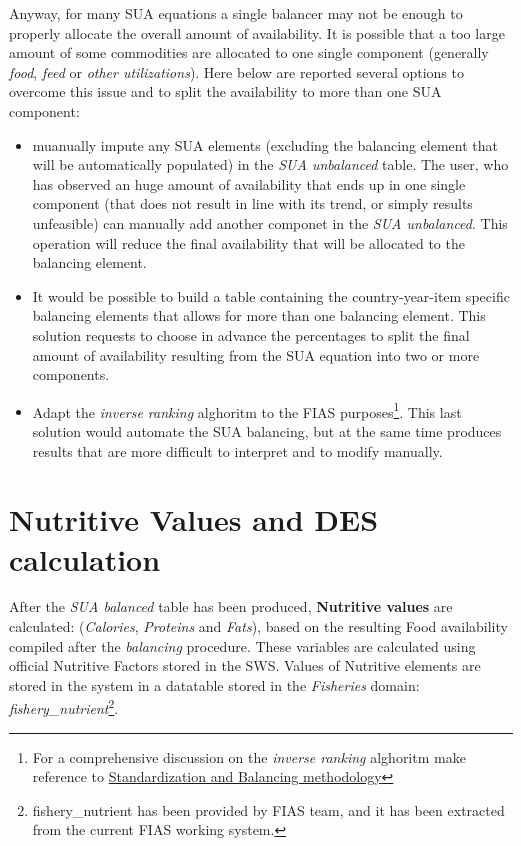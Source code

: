 \documentclass[nojss]{jss}
\begin{document}
Anyway, for many SUA equations a single balancer may not be enough to properly allocate the overall amount of availability. It is possible that a too large amount of some commodities are allocated to one single component (generally \textit{food}, \textit{feed} or \textit{other utilizations}). Here below are reported several options to overcome this issue and to split the availability to more than one SUA component:

\begin{itemize}
\item muanually impute any SUA elements (excluding the balancing element that will be automatically populated) in the \textit{SUA unbalanced} table. The user, who has observed an huge amount of availability that ends up in one single component (that does not result in line with its trend, or simply results unfeasible) can manually add another componet in the \textit{SUA unbalanced}. This operation will reduce the final availability that will be allocated to the balancing element.
\item It would be possible to build a table containing the country-year-item specific  balancing elements that allows for more than one balancing element. This solution requests to choose in advance the percentages to split the final amount of availability resulting from the SUA equation into two or more components.
\item Adapt the \textit{inverse ranking} alghoritm to the FIAS purposes\footnote{For a comprehensive discussion on the \textit{inverse ranking} alghoritm make reference to  \href{https://github.com/SWS-Methodology/faoswsFBSdocumentation/blob/master/documentation/New_Documentation_2018/02_StandDocs_Methodology.pdf}{Standardization and Balancing methodology} }. This last solution would automate the SUA balancing, but at the same time produces results that are more difficult to interpret and to modify manually.
\end{itemize}

\section{Nutritive Values and DES calculation}
After the \textit{SUA balanced} table has been produced,
\textbf{Nutritive values} are calculated: (\emph{Calories},
\emph{Proteins} and \emph{Fats}), based on the resulting Food availability
compiled after the \textit{balancing} procedure. These variables are calculated
using official Nutritive Factors
stored in the SWS. Values of Nutritive elements are stored in the system
in a datatable stored in the \textit{Fisheries} domain: \textit{fishery_nutrient}\footnote{fishery_nutrient has been provided by FIAS team, and it has been extracted from the current FIAS working system.}.
\end{document}
